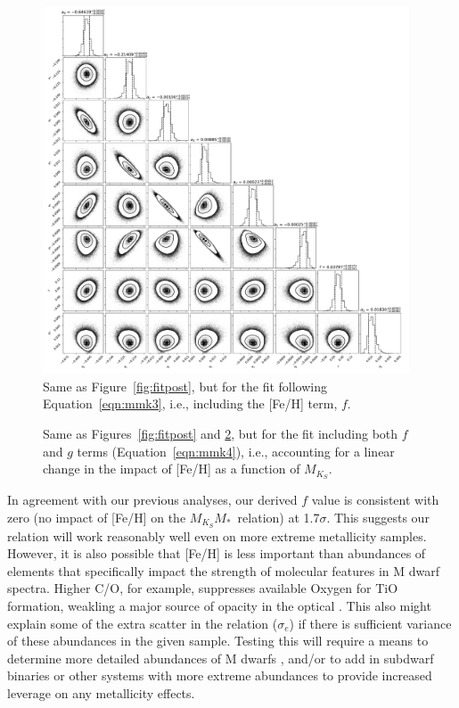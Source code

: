 \documentclass[twocolumn]{aastex62}
\newcommand{\mks}{$M_{K_S}$}
\newcommand{\mmk}{$M_{K_S}$\textendash$M_*$}
\begin{document}
\begin{figure}[p]
\begin{center}
\includegraphics[width=0.97\textwidth]{output_8feh_eMs.pdf}
\caption{Same as Figure~\ref{fig:fitpost}, but for the fit following Equation~\ref{eqn:mmk3}, i.e., including the [Fe/H] term, $f$. }
\label{fig:fitpost_feh}
\end{center}
\end{figure}

\begin{figure}[p]
\begin{center}
\caption{Same as Figures~\ref{fig:fitpost} and \ref{fig:fitpost_feh}, but for the fit including both $f$ and $g$ terms (Equation~\ref{eqn:mmk4}), i.e., accounting for a linear change in the impact of [Fe/H] as a function of \mks. }
\label{fig:fitpost_feh}
\end{center}
\end{figure}

In agreement with our previous analyses, our derived $f$ value is consistent with zero (no impact of [Fe/H] on the \mmk\ relation) at 1.7$\sigma$. This suggests our relation will work reasonably well even on more extreme metallicity samples. However, it is also possible that [Fe/H] is less important than abundances of elements that specifically impact the strength of molecular features in M dwarf spectra. Higher C/O, for example, suppresses available Oxygen for TiO formation, weakling a major source of opacity in the optical \citep[e.g., C, O, Ti,][]{2012ApJ...747L..27F,2015ApJ...804...40G,Veyette2016a}. This also might explain some of the extra scatter in the relation ($\sigma_e$) if there is sufficient variance of these abundances in the given sample. Testing this will require a means to determine more detailed abundances of M dwarfs \citep[e.g.,][]{Veyette2017}, and/or to add in subdwarf binaries or other systems with more extreme abundances to provide increased leverage on any metallicity effects. 
\end{document}
